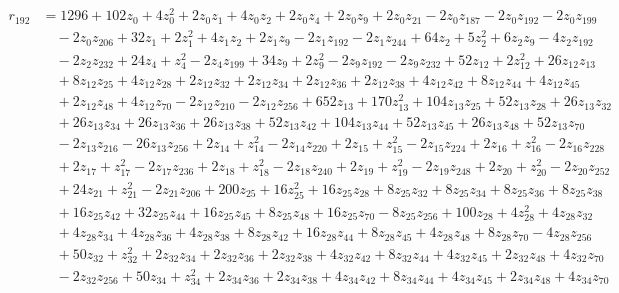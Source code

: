 \begin{align*}
r_{192} &= 1296 + 102z_{0} + 4z_{0}^{2} + 2z_{0}z_{1} + 4z_{0}z_{2} + 2z_{0}z_{4} + 2z_{0}z_{9} + 2z_{0}z_{21} - 2z_{0}z_{187} - 2z_{0}z_{192} - 2z_{0}z_{199} \\
&\quad  - 2z_{0}z_{206} + 32z_{1} + 2z_{1}^{2} + 4z_{1}z_{2} + 2z_{1}z_{9} - 2z_{1}z_{192} - 2z_{1}z_{244} + 64z_{2} + 5z_{2}^{2} + 6z_{2}z_{9} - 4z_{2}z_{192} \\
&\quad  - 2z_{2}z_{232} + 24z_{4} + z_{4}^{2} - 2z_{4}z_{199} + 34z_{9} + 2z_{9}^{2} - 2z_{9}z_{192} - 2z_{9}z_{232} + 52z_{12} + 2z_{12}^{2} + 26z_{12}z_{13} \\
&\quad  + 8z_{12}z_{25} + 4z_{12}z_{28} + 2z_{12}z_{32} + 2z_{12}z_{34} + 2z_{12}z_{36} + 2z_{12}z_{38} + 4z_{12}z_{42} + 8z_{12}z_{44} + 4z_{12}z_{45} \\
&\quad  + 2z_{12}z_{48} + 4z_{12}z_{70} - 2z_{12}z_{210} - 2z_{12}z_{256} + 652z_{13} + 170z_{13}^{2} + 104z_{13}z_{25} + 52z_{13}z_{28} + 26z_{13}z_{32} \\
&\quad  + 26z_{13}z_{34} + 26z_{13}z_{36} + 26z_{13}z_{38} + 52z_{13}z_{42} + 104z_{13}z_{44} + 52z_{13}z_{45} + 26z_{13}z_{48} + 52z_{13}z_{70} \\
&\quad  - 2z_{13}z_{216} - 26z_{13}z_{256} + 2z_{14} + z_{14}^{2} - 2z_{14}z_{220} + 2z_{15} + z_{15}^{2} - 2z_{15}z_{224} + 2z_{16} + z_{16}^{2} - 2z_{16}z_{228} \\
&\quad  + 2z_{17} + z_{17}^{2} - 2z_{17}z_{236} + 2z_{18} + z_{18}^{2} - 2z_{18}z_{240} + 2z_{19} + z_{19}^{2} - 2z_{19}z_{248} + 2z_{20} + z_{20}^{2} - 2z_{20}z_{252} \\
&\quad  + 24z_{21} + z_{21}^{2} - 2z_{21}z_{206} + 200z_{25} + 16z_{25}^{2} + 16z_{25}z_{28} + 8z_{25}z_{32} + 8z_{25}z_{34} + 8z_{25}z_{36} + 8z_{25}z_{38} \\
&\quad  + 16z_{25}z_{42} + 32z_{25}z_{44} + 16z_{25}z_{45} + 8z_{25}z_{48} + 16z_{25}z_{70} - 8z_{25}z_{256} + 100z_{28} + 4z_{28}^{2} + 4z_{28}z_{32} \\
&\quad  + 4z_{28}z_{34} + 4z_{28}z_{36} + 4z_{28}z_{38} + 8z_{28}z_{42} + 16z_{28}z_{44} + 8z_{28}z_{45} + 4z_{28}z_{48} + 8z_{28}z_{70} - 4z_{28}z_{256} \\
&\quad  + 50z_{32} + z_{32}^{2} + 2z_{32}z_{34} + 2z_{32}z_{36} + 2z_{32}z_{38} + 4z_{32}z_{42} + 8z_{32}z_{44} + 4z_{32}z_{45} + 2z_{32}z_{48} + 4z_{32}z_{70} \\
&\quad  - 2z_{32}z_{256} + 50z_{34} + z_{34}^{2} + 2z_{34}z_{36} + 2z_{34}z_{38} + 4z_{34}z_{42} + 8z_{34}z_{44} + 4z_{34}z_{45} + 2z_{34}z_{48} + 4z_{34}z_{70} \\

\end{align*}
